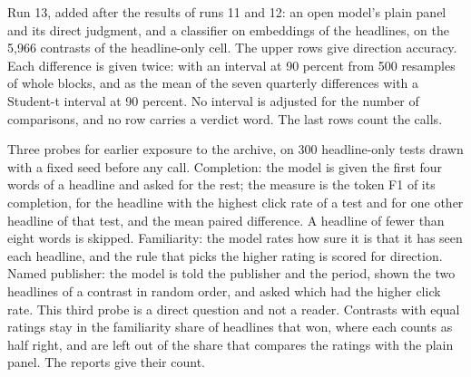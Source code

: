 \begin{table}[t]\centering\footnotesize
\caption{Run 13, added after the results of runs 11 and 12: an open model's plain panel and its direct judgment, and a classifier on embeddings of the headlines, on the 5,966 contrasts of the headline-only cell. The upper rows give direction accuracy. Each difference is given twice: with an interval at 90 percent from 500 resamples of whole blocks, and as the mean of the seven quarterly differences with a Student-t interval at 90 percent. No interval is adjusted for the number of comparisons, and no row carries a verdict word. The last rows count the calls.}
\label{tab:fmt-readers-open-model}

\end{table}

\begin{table}[t]\centering\footnotesize
\caption{Three probes for earlier exposure to the archive, on 300 headline-only tests drawn with a fixed seed before any call. Completion: the model is given the first four words of a headline and asked for the rest; the measure is the token F1 of its completion, for the headline with the highest click rate of a test and for one other headline of that test, and the mean paired difference. A headline of fewer than eight words is skipped. Familiarity: the model rates how sure it is that it has seen each headline, and the rule that picks the higher rating is scored for direction. Named publisher: the model is told the publisher and the period, shown the two headlines of a contrast in random order, and asked which had the higher click rate. This third probe is a direct question and not a reader. Contrasts with equal ratings stay in the familiarity share of headlines that won, where each counts as half right, and are left out of the share that compares the ratings with the plain panel. The reports give their count.}
\label{tab:fmt-readers-probes}

\end{table}

